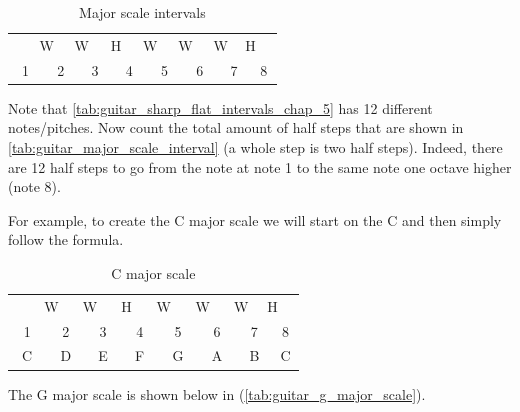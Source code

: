 \begin{table}[h]
	\centering
	\begin{tabular}{*{16}{c}}
		& \multicolumn{2}{P{4mm}}{\large{W}} & \multicolumn{2}{P{4mm}}{\large{W}} & \multicolumn{2}{P{4mm}}{\large{H}} & \multicolumn{2}{P{4mm}}{\large{W}} & \multicolumn{2}{P{4mm}}{\large{W}} & \multicolumn{2}{P{4mm}}{\large{W}} & \multicolumn{2}{P{4mm}}{\large{H}} & \\
		\multicolumn{2}{P{4mm}}{1} & \multicolumn{2}{P{4mm}}{2} & \multicolumn{2}{P{4mm}}{3} & \multicolumn{2}{P{4mm}}{4} & \multicolumn{2}{P{4mm}}{5} & \multicolumn{2}{P{4mm}}{6} & \multicolumn{2}{P{4mm}}{7} & \multicolumn{2}{P{4mm}}{8}
	\end{tabular}
	\caption{Major scale intervals}
	\label{tab:guitar_major_scale_interval}
\end{table}

Note that \autoref{tab:guitar_sharp_flat_intervals_chap_5} has 12 different notes/pitches. Now count the total amount of half steps that are shown in \autoref{tab:guitar_major_scale_interval} (a whole step is two half steps). Indeed, there are 12 half steps to go from the note at note 1 to the same note one octave higher (note 8).

For example, to create the C major scale we will start on the C and then simply follow the formula.

\begin{table}[h]
	\centering
	\begin{tabular}{*{16}{c}}
		& \multicolumn{2}{P{4mm}}{\large{W}} & \multicolumn{2}{P{4mm}}{\large{W}} & \multicolumn{2}{P{4mm}}{\large{H}} & \multicolumn{2}{P{4mm}}{\large{W}} & \multicolumn{2}{P{4mm}}{\large{W}} & \multicolumn{2}{P{4mm}}{\large{W}} & \multicolumn{2}{P{4mm}}{\large{H}} & \\
		\multicolumn{2}{P{4mm}}{1} & \multicolumn{2}{P{4mm}}{2} & \multicolumn{2}{P{4mm}}{3} & \multicolumn{2}{P{4mm}}{4} & \multicolumn{2}{P{4mm}}{5} & \multicolumn{2}{P{4mm}}{6} & \multicolumn{2}{P{4mm}}{7} & \multicolumn{2}{P{4mm}}{8} \\
		\multicolumn{2}{P{4mm}}{C} & \multicolumn{2}{P{4mm}}{D} & \multicolumn{2}{P{4mm}}{E} & \multicolumn{2}{P{4mm}}{F} & \multicolumn{2}{P{4mm}}{G} & \multicolumn{2}{P{4mm}}{A} & \multicolumn{2}{P{4mm}}{B} & \multicolumn{2}{P{4mm}}{C}
	\end{tabular}
	\caption{C major scale}
	\label{tab:guitar_c_major_scale}
\end{table}

\iffalse
The G major scale is shown below in (\autoref{tab:guitar_g_major_scale}).

